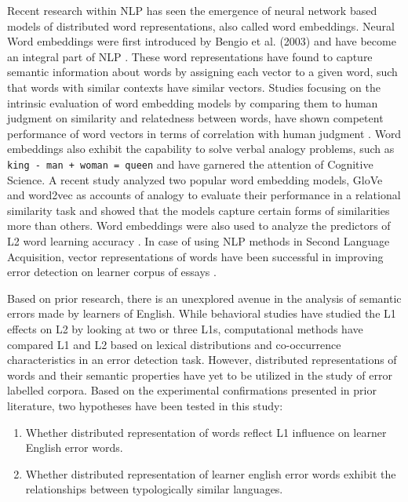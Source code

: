 \documentclass[10pt,letterpaper]{article}
\begin{document}
Recent research within NLP has seen the emergence of neural network based models of distributed word representations, also called word embeddings. Neural Word embeddings were first introduced by Bengio et al. (2003) and have become an integral part of NLP . These word representations have found to capture semantic information about words by assigning each vector to a given word, such that words with similar contexts have similar vectors. Studies focusing on the intrinsic evaluation of word embedding models by comparing them to human judgment on similarity and relatedness between words, have shown competent performance of word vectors in terms of correlation with human judgment . Word embeddings also exhibit the capability to solve verbal analogy problems, such as \texttt{king - man + woman = queen} and have garnered the attention of Cognitive Science. A recent study analyzed two popular word embedding models, GloVe and word2vec as accounts of analogy to evaluate their performance in a relational similarity task  and showed that the models capture certain forms of similarities more than others. Word embeddings were also used to analyze the predictors of L2 word learning accuracy . In case of using NLP methods in Second Language Acquisition, vector representations of words have been successful in improving error detection on learner corpus of essays .

Based on prior research, there is an unexplored avenue in the analysis of semantic errors made by learners of English. While behavioral studies have studied the L1 effects on L2 by looking at two or three L1s, computational methods have compared L1 and L2 based on lexical distributions and co-occurrence characteristics in an error detection task. However, distributed representations of words and their semantic properties have yet to be utilized in the study of error labelled corpora. Based on the experimental confirmations presented in prior literature, two hypotheses have been tested in this study:

\begin{enumerate}
    \item Whether distributed representation of words reflect L1 influence on learner English error words.
    \item Whether distributed representation of learner english error words exhibit the relationships between typologically similar languages.
\end{enumerate}
\end{document}

